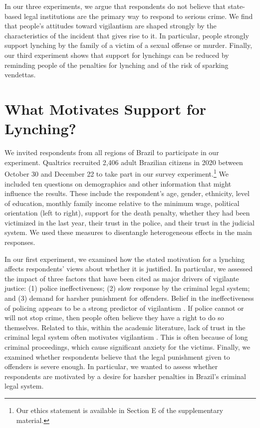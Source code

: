 \documentclass[12pt,ansiapaper]{article}
\begin{document}
In our three experiments, we argue that respondents do not believe that state-based legal institutions are the primary way to respond to serious crime. We find that people's attitudes toward vigilantism are shaped strongly by the characteristics of the incident that gives rise to it. In particular, people strongly support lynching by the family of a victim of a sexual offense or murder. Finally, our third experiment shows that support for lynchings can be reduced by reminding people of the penalties for lynching and of the risk of sparking vendettas. 


\section{What Motivates Support for Lynching?}
\label{sub:exp02}
We invited respondents from all regions of Brazil to participate in our experiment. Qualtrics recruited 2,406 adult Brazilian citizens in 2020 between October 30 and December 22 to take part in our survey experiment.\footnote{Our ethics statement is available in Section E of the supplementary material.} We included ten questions on demographics and other information that might influence the results. These include the respondent's age, gender, ethnicity, level of education, monthly family income relative to the minimum wage, political orientation (left to right), support for the death penalty, whether they had been victimized in the last year, their trust in the police, and their trust in the judicial system. We used these measures to disentangle heterogeneous effects in the main responses.

In our first experiment, we examined how the stated motivation for a lynching affects respondents' views about whether it is justified. In particular, we assessed the impact of three factors that have been cited as major drivers of vigilante justice: (1) police ineffectiveness; (2) slow response by the criminal legal system; and (3) demand for harsher punishment for offenders. Belief in the ineffectiveness of policing appears to be a strong predictor of vigilantism \citep{cruz2019determinants, garcia2019anger}. If police cannot or will not stop crime, then people often believe they have a right to do so themselves. Related to this, within the academic literature, lack of trust in the criminal legal system often motivates vigilantism \citep{godoy2004justice, smith2019contradictions}. This is often because of long criminal proceedings, which cause significant anxiety for the victims. Finally, we examined whether respondents believe that the legal punishment given to offenders is severe enough. In particular, we wanted to assess whether respondents are motivated by a desire for harsher penalties in Brazil's criminal legal system.  
\end{document}
